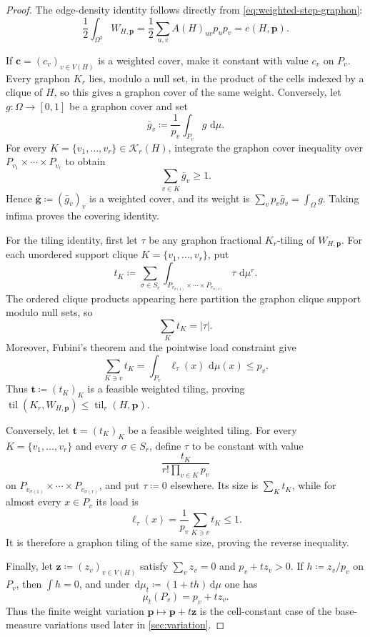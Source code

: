 \documentclass[10pt]{article}
\numberwithin{equation}{section}
\newcommand{\til}{\operatorname{til}}
\newcommand{\vct}[1]{\boldsymbol{#1}}
\newcommand{\dd}{\,\mathrm d}
\begin{document}
\begin{proof}
The edge-density identity follows directly from \cref{eq:weighted-step-graphon}:
\[
 \frac12\int_{\Omega^2}W_{H,\vct p}
 =\frac12\sum_{u,v}A(H)_{uv}p_up_v
 =e(H,\vct p).
\]

If $\vct c=(c_v)_{v\in V(H)}$ is a weighted cover, make it constant with value $c_v$ on $P_v$.  Every graphon $K_r$ lies, modulo a null set, in the product of the cells indexed by a clique of $H$, so this gives a graphon cover of the same weight.  Conversely, let $g:\Omega\to[0,1]$ be a graphon cover and set
\[
 \bar g_v\coloneqq\frac1{p_v}\int_{P_v}g\,\dd\mu.
\]
For every $K=\{v_1,\ldots,v_r\}\in\mathcal K_r(H)$, integrate the graphon cover inequality over $P_{v_1}\times\cdots\times P_{v_r}$ to obtain
\[
 \sum_{v\in K}\bar g_v\ge1.
\]
Hence $\vct{\bar g}\coloneqq(\bar g_v)_v$ is a weighted cover, and its weight is $\sum_vp_v\bar g_v=\int_\Omega g$.  Taking infima proves the covering identity.

For the tiling identity, first let $\tau$ be any graphon fractional $K_r$-tiling of $W_{H,\vct p}$.  For each unordered support clique $K=\{v_1,\ldots,v_r\}$, put
\[
 t_K\coloneqq
 \sum_{\sigma\in S_r}
 \int_{P_{v_{\sigma(1)}}\times\cdots\times P_{v_{\sigma(r)}}}
 \tau\,\dd\mu^r.
\]
The ordered clique products appearing here partition the graphon clique support modulo null sets, so
\[
 \sum_Kt_K=|\tau|.
\]
Moreover, Fubini's theorem and the pointwise load constraint give
\[
 \sum_{K\ni v}t_K
 =\int_{P_v}\ell_\tau(x)\,\dd\mu(x)
 \le p_v.
\]
Thus $\vct t\coloneqq(t_K)_K$ is a feasible weighted tiling, proving $\til(K_r,W_{H,\vct p})\le\til_r(H,\vct p)$.

Conversely, let $\vct t=(t_K)_K$ be a feasible weighted tiling.  For every $K=\{v_1,\ldots,v_r\}$ and every $\sigma\in S_r$, define $\tau$ to be constant with value
\[
 \frac{t_K}{r!\prod_{v\in K}p_v}
\]
on $P_{v_{\sigma(1)}}\times\cdots\times P_{v_{\sigma(r)}}$, and put $\tau\coloneqq0$ elsewhere.  Its size is $\sum_Kt_K$, while for almost every $x\in P_v$ its load is
\[
 \ell_\tau(x)=\frac1{p_v}\sum_{K\ni v}t_K\le1.
\]
It is therefore a graphon tiling of the same size, proving the reverse inequality.

Finally, let $\vct z\coloneqq(z_v)_{v\in V(H)}$ satisfy $\sum_vz_v=0$ and $p_v+tz_v>0$.  If $h\coloneqq z_v/p_v$ on $P_v$, then $\int h=0$, and under $\dd\mu_t\coloneqq(1+th)\dd\mu$ one has
\[
 \mu_t(P_v)=p_v+tz_v.
\]
Thus the finite weight variation $\vct p\mapsto\vct p+t\vct z$ is the cell-constant case of the base-measure variations used later in \cref{sec:variation}.
\end{proof}
\end{document}
